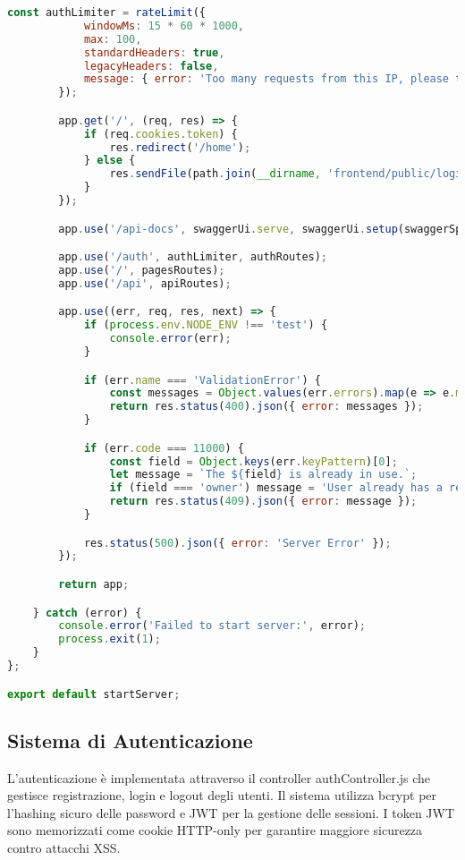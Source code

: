 \documentclass[12pt,a4paper]{article}
\begin{document}
\begin{lstlisting}[language=JavaScript, caption=Configurazione del server principale]
        const authLimiter = rateLimit({
            windowMs: 15 * 60 * 1000, 
            max: 100, 
            standardHeaders: true,
            legacyHeaders: false,
            message: { error: 'Too many requests from this IP, please try again after 15 minutes' }
        });

        app.get('/', (req, res) => {
            if (req.cookies.token) {
                res.redirect('/home');
            } else {
                res.sendFile(path.join(__dirname, 'frontend/public/login.html'));
            }
        });

        app.use('/api-docs', swaggerUi.serve, swaggerUi.setup(swaggerSpec));

        app.use('/auth', authLimiter, authRoutes); 
        app.use('/', pagesRoutes); 
        app.use('/api', apiRoutes); 

        app.use((err, req, res, next) => {
            if (process.env.NODE_ENV !== 'test') {
                console.error(err);
            }

            if (err.name === 'ValidationError') {
                const messages = Object.values(err.errors).map(e => e.message);
                return res.status(400).json({ error: messages });
            }

            if (err.code === 11000) {
                const field = Object.keys(err.keyPattern)[0];
                let message = `The ${field} is already in use.`;
                if (field === 'owner') message = 'User already has a restaurant.';
                return res.status(409).json({ error: message });
            }

            res.status(500).json({ error: 'Server Error' });
        });

        return app;

    } catch (error) {
        console.error('Failed to start server:', error);
        process.exit(1);
    }
};

export default startServer;
\end{lstlisting}

\subsection{Sistema di Autenticazione}

L'autenticazione è implementata attraverso il controller authController.js che gestisce registrazione, login e logout degli utenti. Il sistema utilizza bcrypt per l'hashing sicuro delle password e JWT per la gestione delle sessioni. I token JWT sono memorizzati come cookie HTTP-only per garantire maggiore sicurezza contro attacchi XSS.
\end{document}
